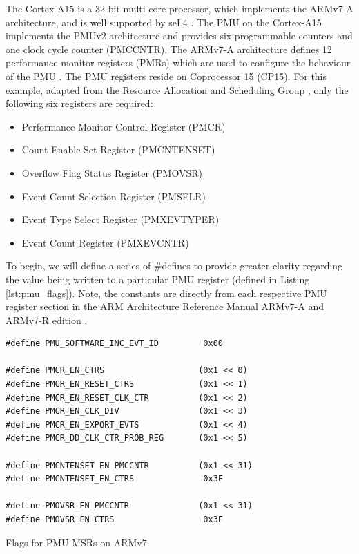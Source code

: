 {The Cortex-A15 is a 32-bit multi-core processor, which implements the ARMv7-A architecture, and is well supported by seL4 \cite{DocsSeL4Hardware}. The PMU on the Cortex-A15 implements the PMUv2 architecture and provides six programmable counters \cite{DocsArmCortexA15PMU} and one clock cycle counter (PMCCNTR). The ARMv7-A architecture defines 12 performance monitor registers (PMRs) which are used to configure the behaviour of the PMU \cite{DocsArmv7PMURegs}. The PMU registers reside on Coprocessor 15 (CP15). For this example, adapted from the Resource Allocation and Scheduling Group \cite{TutHowToUsePMU}, only the following six registers are required:

\ssp

\begin{itemize}
    \item Performance Monitor Control Register (PMCR)
    \item Count Enable Set Register (PMCNTENSET)
    \item Overflow Flag Status Register (PMOVSR)
    \item Event Count Selection Register (PMSELR)
    \item Event Type Select Register (PMXEVTYPER)
    \item Event Count Register (PMXEVCNTR)
\end{itemize}

\dsp

To begin, we will define a series of \#defines to provide greater clarity regarding the value being written to a particular PMU register (defined in Listing \ref{lst:pmu_flags}). Note, the constants are directly from each respective PMU register section in the ARM Architecture Reference Manual ARMv7-A and ARMv7-R edition \cite{DocsArvm7}.

\begin{listing}[!ht]
    \begin{verbatim}
#define PMU_SOFTWARE_INC_EVT_ID         0x00

#define PMCR_EN_CTRS                   (0x1 << 0)
#define PMCR_EN_RESET_CTRS             (0x1 << 1)
#define PMCR_EN_RESET_CLK_CTR          (0x1 << 2)
#define PMCR_EN_CLK_DIV                (0x1 << 3)
#define PMCR_EN_EXPORT_EVTS            (0x1 << 4)
#define PMCR_DD_CLK_CTR_PROB_REG       (0x1 << 5)

#define PMCNTENSET_EN_PMCCNTR          (0x1 << 31)
#define PMCNTENSET_EN_CTRS              0x3F

#define PMOVSR_EN_PMCCNTR              (0x1 << 31)
#define PMOVSR_EN_CTRS                  0x3F
    \end{verbatim}
    \caption{Flags for PMU MSRs on ARMv7.}
    \label{lst:pmu_flags}
\end{listing}

}
